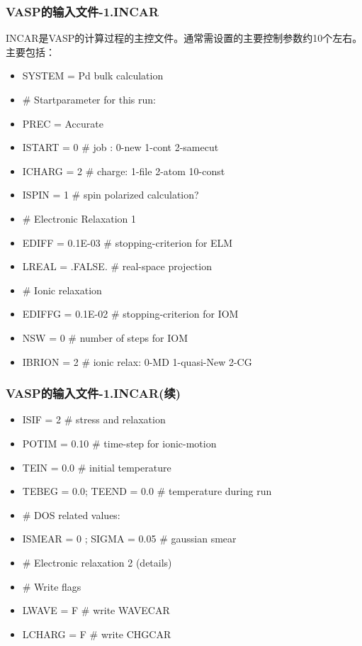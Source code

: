 \documentclass[cjk,slidestop,compress,mathserif,blue]{beamer}
\begin{document}
\frame
{
\frametitle{VASP的输入文件-1.INCAR}
\textrm{INCAR}是\textrm{VASP}的计算过程的主控文件。通常需设置的主要控制参数约10个左右。主要包括：
\begin{itemize}
	\item \textrm{SYSTEM = Pd bulk calculation}
	\item \textrm{\# Startparameter for this run:}
	\item \textrm{PREC = Accurate}
	\item \textrm{ISTART = 0 \# job : 0-new 1-cont 2-samecut}
	\item \textrm{ICHARG = 2 \# charge: 1-file 2-atom 10-const}
	\item \textrm{ISPIN = 1 \# spin polarized calculation?}
	\item \textrm{\# Electronic Relaxation 1}
	\item \textrm{EDIFF = 0.1E-03 \# stopping-criterion for ELM}
	\item \textrm{LREAL = .FALSE. \# real-space projection}
	\item \textrm{\# Ionic relaxation}
	\item \textrm{EDIFFG = 0.1E-02 \# stopping-criterion for IOM}
	\item \textrm{NSW = 0 \# number of steps for IOM}
	\item \textrm{IBRION = 2 \# ionic relax: 0-MD 1-quasi-New 2-CG}
\end{itemize}
}

\frame
{
\frametitle{VASP的输入文件-1.INCAR(续)}
\begin{itemize}
	\item \textrm{ISIF = 2 \# stress and relaxation}
	\item \textrm{POTIM = 0.10 \# time-step for ionic-motion}
	\item \textrm{TEIN = 0.0 \# initial temperature}
	\item \textrm{TEBEG = 0.0; TEEND = 0.0 \# temperature during run}
	\item \textrm{\# DOS related values:}
	\item \textrm{ISMEAR = 0 ; SIGMA = 0.05 \# gaussian smear} 
	\item \textrm{\# Electronic relaxation 2 (details)}
	\item \textrm{\# Write flags}
	\item \textrm{LWAVE = F \# write WAVECAR}
	\item \textrm{LCHARG = F \# write CHGCAR}
\end{itemize}
}
\end{document}
